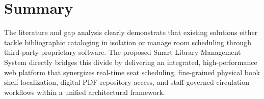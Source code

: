 \section{Summary}
The literature and gap analysis clearly demonstrate that existing solutions either tackle bibliographic cataloging in isolation or manage room scheduling through third-party proprietary software. The proposed Smart Library Management System directly bridges this divide by delivering an integrated, high-performance web platform that synergizes real-time seat scheduling, fine-grained physical book shelf localization, digital PDF repository access, and staff-governed circulation workflows within a unified architectural framework.

